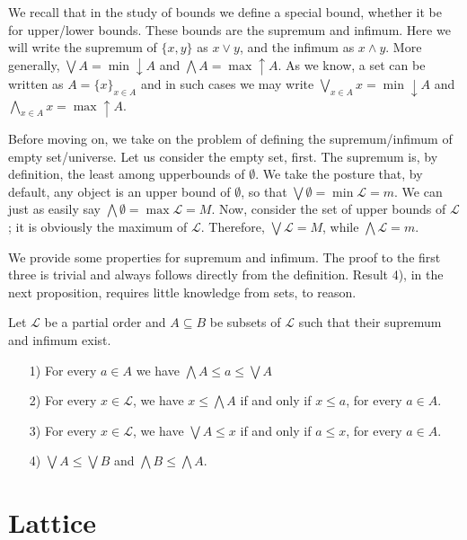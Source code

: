 \documentclass [12pt]{book}
\begin{document}
We recall that in the study of bounds we define a special bound, whether it be for upper/lower bounds. These bounds are the supremum and infimum. Here we will write the supremum of $\{x,y\}$ as $x\vee y$, and the infimum as $x\wedge y$. More generally, $\bigvee A=\min\downarrow A$ and $\bigwedge A=\max\uparrow A$. As we know, a set can be written as $A=\{x\}_{x\in A}$ and in such cases we may write $\bigvee_{x\in A}x=\min\downarrow A$ and $\bigwedge_{x\in A}x=\max\uparrow A$.


Before moving on, we take on the problem of defining the supremum/infimum of empty set/universe. Let us consider the empty set, first. The supremum is, by definition, the least among upperbounds of $\emptyset$. We take the posture that, by default, any object is an upper bound of $\emptyset$, so that $\bigvee\emptyset=\min\mathcal L=m$. We can just as easily say $\bigwedge\emptyset=\max\mathcal L=M$. Now, consider the set of upper bounds of $\mathcal L$; it is obviously the maximum of $\mathcal L$. Therefore, $\bigvee\mathcal L=M$, while $\bigwedge\mathcal L=m$.

 We provide some properties for supremum and infimum. The proof to the first three is trivial and always follows directly from the definition. Result 4), in the next proposition, requires little knowledge from sets, to reason.

\begin{proposition}Let $\mathcal L$ be a partial order and $A\subseteq B$ be subsets of $\mathcal L$ such that their supremum and infimum exist.

\begin{itemize}

	\item[1)]For every $a\in A$ we have $\bigwedge A\leq a\leq\bigvee A$

	\item[2)]For every $x\in\mathcal L$, we have $x\leq\bigwedge A$ if and only if $x\leq a$, for every $a\in A$.

	\item[3)]For every $x\in\mathcal L$, we have $\bigvee A\leq x$ if and only if $a\leq x$, for every $a\in A$.

	\item[4)]$\bigvee A\leq\bigvee B$ and $\bigwedge B\leq\bigwedge A$.

\end{itemize}\label{prop sup 1}\end{proposition}

		\section{Lattice}
\end{document}
